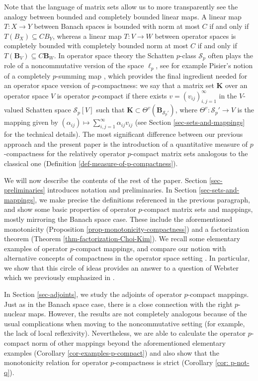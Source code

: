 \documentclass[11pt]{amsart}
\numberwithin{equation}{section}
\begin{document}
Note that the language of matrix sets allow us to more transparently see the analogy between bounded and completely bounded linear maps. A linear map $T : X \to Y$ between Banach spaces is bounded with norm at most $C$ if and only if $T(B_X) \subseteq C B_Y$, whereas a linear map $T : V \to W$ between operator spaces is completely bounded with completely bounded norm at most $C$ if and only if $T(\mathbf{B}_V) \subseteq C \mathbf{B}_W$.
In operator space theory the Schatten $p$-class $\mathcal{S}_p$ often plays the role of a noncommutative version of the space $\ell_p$, see for example Pisier's notion of a completely $p$-summing map \cite{Pisier-Asterisque}, which provides the final ingredient needed for an operator space version of $p$-compactness: we say that a matrix set $\mathbf{K}$ over an operator space $V$ is operator $p$-compact if there exists $v=(v_{ij})_{i,j=1}^\infty$ in the $V$-valued Schatten space $\mathcal{S}_p[V]$ such that $\mathbf{K}\subset \Theta^v(\mathbf{B}_{\mathcal{S}_p'})$, where $\Theta^v: \mathcal{S}_p' \to V$ is the mapping given by $(\alpha_{ij}) \mapsto \sum_{i,j=1}^{\infty} \alpha_{ij} v_{ij}$ (see Section \ref{sec-sets-and-mappings} for the technical details).
The most significant difference between our previous approach \cite{ChaDiGa-Operator-p-compact} and the present paper is the introduction of a quantitative measure of $p$-compactness for the relatively operator $p$-compact matrix sets analogous to the classical one (Definition \ref{def-measure-of-p-compactness}). 

We will now describe the contents of the rest of the paper. Section \ref{sec-preliminaries} introduces notation and preliminaries.
In Section \ref{sec-sets-and-mappings}, we make precise the definitions referenced in the previous paragraph, and show some basic properties of operator $p$-compact matrix sets and mappings, mostly mirroring the Banach space case. These include the aforementioned monotonicity (Proposition \ref{prop-monotonicity-compactness}) and a factorization theorem (Theorem \ref{thm-factorization-Choi-Kim}).
We recall some elementary examples of operator $p$-compact mappings, and compare our notion with alternative concepts of compactness in the operator space setting \cite{Webster,Yew}.
In particular, we show that this circle of ideas provides an answer to a question of Webster which we previously emphasized in \cite[Problem 4.3]{ChaDiGa-Operator-p-compact}.

In Section \ref{sec-adjoints}, we study the adjoints of operator $p$-compact mappings. Just as in the Banach space case, there is a close connection with the right $p$-nuclear maps. However, the results are not completely analogous because of the usual complications when moving to the noncommutative setting (for example, the lack of local reflexivity). 
Nevertheless, we are able to calculate the operator $p$-compact norm of other mappings beyond the aforementioned elementary examples (Corollary \ref{cor-examples-p-compact}) and also show that the monotonicity relation for operator $p$-compactness is strict (Corollary \ref{cor: p-not-q}).
\end{document}
